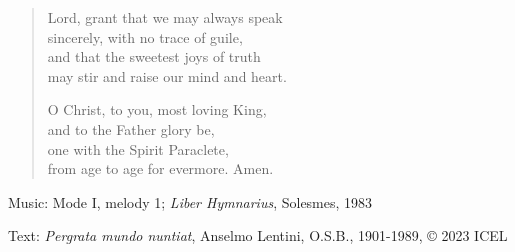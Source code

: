 \hymn



\setlength{\leftmargini}{2em}
\begin{verse}
Lord, grant that we may always speak\\
sincerely, with no trace of guile,\\
and that the sweetest joys of truth\\
may stir and raise our mind and heart.

O Christ, to you, most loving King,\\
and to the Father glory be,\\
one with the Spirit Paraclete,\\
from age to age for evermore. Amen.
\end{verse}
\setlength{\leftmargini}{\defleftmargini}

\begin{hymnsource}
Music: Mode I, melody 1; \emph{Liber Hymnarius}, Solesmes, 1983

Text: \emph{Pergrata mundo nuntiat}, Anselmo Lentini, O.S.B., 1901-1989, © 2023 ICEL
\end{hymnsource}
